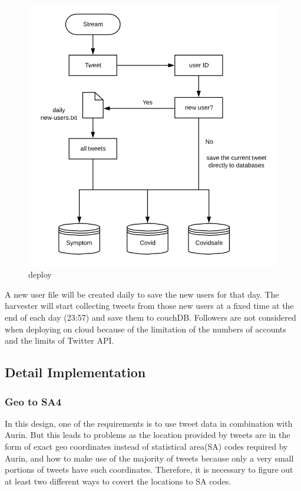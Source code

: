 \begin{figure}[h!]
\centering
\includegraphics[scale=0.4]{city_analytics/report/images/deployment.png}
\caption{deploy}
\label{fig:stream}
\end{figure}

A new user file will be created daily to save the new users for that day. The harvester will start collecting tweets from those new users at a fixed time at the end of each day (23:57) and save them to couchDB. Followers are not considered when deploying on cloud because of the limitation of the numbers of accounts and the limits of Twitter API.

\subsection{Detail Implementation}

\subsubsection{Geo to SA4}
In this design, one of the requirements is to use tweet data in combination with Aurin. But this leads to problems as the location provided by tweets are in the form of exact geo coordinates instead of statistical area(SA) codes required by Aurin, and how to make use of the majority of tweets because only a very small portions of tweets have such coordinates. Therefore, it is necessary to figure out at least two different ways to covert the locations to SA codes.


